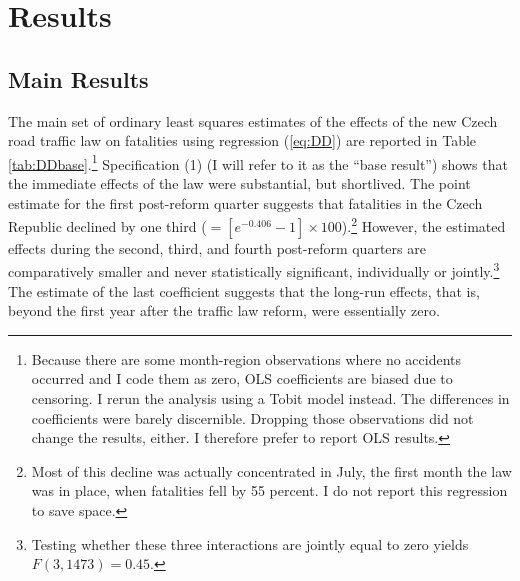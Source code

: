 \documentclass[12pt]{article}
\begin{document}
\section{Results} %
\label{sec:results}

\subsection{Main Results} %

The main set of ordinary least squares estimates of the effects of the new Czech
road traffic law on fatalities using regression (\ref{eq:DD}) are reported in
Table \ref{tab:DDbase}.\footnote{Because there are some month-region
  observations where no accidents occurred and I code them as zero, OLS
  coefficients are biased due to censoring. I rerun the analysis using a Tobit
  model instead. The differences in coefficients were barely discernible.
  Dropping those observations did not change the results, either. I therefore
  prefer to report OLS results.} Specification (1) (I will refer to it as the
``base result'') shows that the immediate effects of the law were substantial,
but shortlived. The point estimate for the first post-reform quarter suggests
that fatalities in the Czech Republic declined by one third ($ = [e^{-0.406} -
1] \times 100$).\footnote{Most of this decline was actually concentrated in
  July, the first month the law was in place, when fatalities fell by 55
  percent. I do not report this regression to save space.} However, the
estimated effects during the second, third, and fourth post-reform quarters are
comparatively smaller and never statistically significant, individually or
jointly.\footnote{Testing whether these three interactions are jointly equal to
  zero yields $F(3, 1473) = 0.45$.} The estimate of the last coefficient
suggests that the long-run effects, that is, beyond the first year after the
traffic law reform, were essentially zero. 
\end{document}
